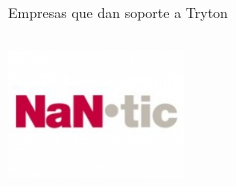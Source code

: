 \begin{frame}{Empresas que dan soporte a Tryton}
\begin{columns}
            \begin{center}
            \includegraphics[width=0.8\textwidth]{./Images/NaNtic.JPG}
            \end{center}
        \end{columns}


    \end{frame}


